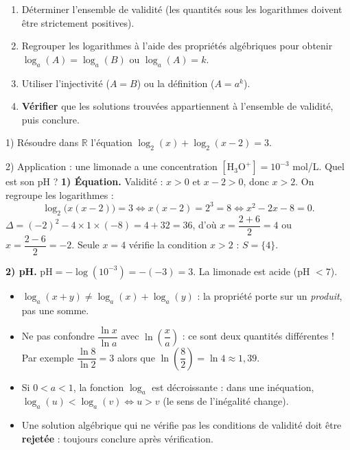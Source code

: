 \documentclass[11pt]{article}
\begin{document}
\begin{methode}
\begin{enumerate}
\item Déterminer l'ensemble de validité (les quantités sous les logarithmes doivent être strictement positives).
\item Regrouper les logarithmes à l'aide des propriétés algébriques pour obtenir $\log_a(A) = \log_a(B)$ ou $\log_a(A) = k$.
\item Utiliser l'injectivité ($A = B$) ou la définition ($A = a^k$).
\item \textbf{Vérifier} que les solutions trouvées appartiennent à l'ensemble de validité, puis conclure.
\end{enumerate}
\end{methode}

\begin{exoresolu}
1) Résoudre dans $\mathbb{R}$ l'équation $\log_2(x) + \log_2(x-2) = 3$.

2) Application : une limonade a une concentration $[\mathrm{H}_3\mathrm{O}^+] = 10^{-3}$ mol/L. Quel est son pH ?
\tcblower
\textbf{1) Équation.} Validité : $x > 0$ et $x - 2 > 0$, donc $x > 2$. On regroupe les logarithmes :
\[ \log_2\big(x(x-2)\big) = 3 \iff x(x-2) = 2^3 = 8 \iff x^2 - 2x - 8 = 0. \]
$\Delta = (-2)^2 - 4 \times 1 \times (-8) = 4 + 32 = 36$, d'où $x = \dfrac{2 + 6}{2} = 4$ ou $x = \dfrac{2 - 6}{2} = -2$. Seule $x = 4$ vérifie la condition $x > 2$ : \quad $S = \{4\}$.

\textbf{2) pH.} $\mathrm{pH} = -\log(10^{-3}) = -(-3) = 3$. La limonade est acide (pH $< 7$).
\end{exoresolu}

\begin{attention}
\begin{itemize}
\item $\log_a(x + y) \neq \log_a(x) + \log_a(y)$ : la propriété porte sur un \emph{produit}, pas une somme.
\item Ne pas confondre $\dfrac{\ln x}{\ln a}$ avec $\ln\left(\dfrac{x}{a}\right)$ : ce sont deux quantités différentes ! Par exemple $\dfrac{\ln 8}{\ln 2} = 3$ alors que $\ln\left(\dfrac{8}{2}\right) = \ln 4 \approx 1{,}39$.
\item Si $0 < a < 1$, la fonction $\log_a$ est décroissante : dans une inéquation, $\log_a(u) < \log_a(v) \iff u > v$ (le sens de l'inégalité change).
\item Une solution algébrique qui ne vérifie pas les conditions de validité doit être \textbf{rejetée} : toujours conclure après vérification.
\end{itemize}
\end{attention}
\end{document}
